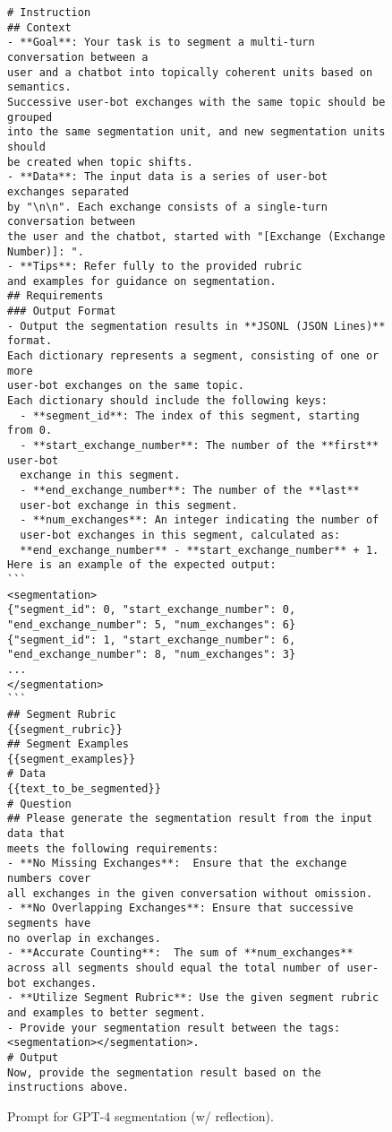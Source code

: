 \begin{figure}[htb]
\small
\begin{tcolorbox}[left=3pt,right=3pt,top=3pt,bottom=3pt,title=Instruction Part of the Segmentation Prompt (W/ Reflection).]
\begin{verbatim}
# Instruction
## Context
- **Goal**: Your task is to segment a multi-turn conversation between a 
user and a chatbot into topically coherent units based on semantics. 
Successive user-bot exchanges with the same topic should be grouped 
into the same segmentation unit, and new segmentation units should 
be created when topic shifts.
- **Data**: The input data is a series of user-bot exchanges separated 
by "\n\n". Each exchange consists of a single-turn conversation between 
the user and the chatbot, started with "[Exchange (Exchange Number)]: ".
- **Tips**: Refer fully to the provided rubric 
and examples for guidance on segmentation.
## Requirements
### Output Format
- Output the segmentation results in **JSONL (JSON Lines)** format. 
Each dictionary represents a segment, consisting of one or more 
user-bot exchanges on the same topic. 
Each dictionary should include the following keys:
  - **segment_id**: The index of this segment, starting from 0.
  - **start_exchange_number**: The number of the **first** user-bot 
  exchange in this segment.
  - **end_exchange_number**: The number of the **last** 
  user-bot exchange in this segment.
  - **num_exchanges**: An integer indicating the number of 
  user-bot exchanges in this segment, calculated as:
  **end_exchange_number** - **start_exchange_number** + 1.
Here is an example of the expected output:
```
<segmentation>
{"segment_id": 0, "start_exchange_number": 0, 
"end_exchange_number": 5, "num_exchanges": 6}
{"segment_id": 1, "start_exchange_number": 6, 
"end_exchange_number": 8, "num_exchanges": 3}
...
</segmentation>
```
## Segment Rubric
{{segment_rubric}}
## Segment Examples
{{segment_examples}}
# Data
{{text_to_be_segmented}}
# Question
## Please generate the segmentation result from the input data that 
meets the following requirements:
- **No Missing Exchanges**:  Ensure that the exchange numbers cover 
all exchanges in the given conversation without omission. 
- **No Overlapping Exchanges**: Ensure that successive segments have 
no overlap in exchanges.
- **Accurate Counting**:  The sum of **num_exchanges**
across all segments should equal the total number of user-bot exchanges.
- **Utilize Segment Rubric**: Use the given segment rubric 
and examples to better segment.
- Provide your segmentation result between the tags:
<segmentation></segmentation>.
# Output
Now, provide the segmentation result based on the instructions above.
\end{verbatim}
\end{tcolorbox}
\caption{Prompt for GPT-4 segmentation (w/ reflection).}
\label{fig: prompt4seg}
\end{figure}